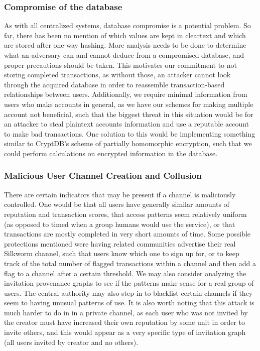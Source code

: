 \documentclass[letterpaper,twocolumn,10pt]{article}
\begin{document}
\subsubsection{Compromise of the database}
As with all centralized systems, database compromise is a potential problem. So far, there has been no mention of which values are kept in cleartext and which are stored after one-way hashing. More analysis needs to be done to determine what an adversary can and cannot deduce from a compromised database, and proper precautions should be taken. This motivates our commitment to not storing completed transactions, as without those, an attacker cannot look through the acquired database in order to reassemble transaction-based relationships between users. Additionally, we require minimal information from users who make accounts in general, as we have our schemes for making multiple account not beneficial, such that the biggest threat in this situation would be for an attacker to steal plaintext accounts information and use a reputable account to make bad transactions. One solution to this would be implementing something similar to CryptDB's \cite{CryptDB} scheme of partially homomorphic encryption, such that we could perform calculations on encrypted information in the database. 

\subsubsection{Malicious User Channel Creation and Collusion}
There are certain indicators that may be present if a channel is maliciously controlled. One would be that all users have generally similar amounts of reputation and transaction scores, that access patterns seem relatively uniform (as opposed to timed when a group humans would use the service), or that transactions are mostly completed in very short amounts of time. Some possible protections mentioned were having related communities advertise their real Silkworm channel, such that users know which one to sign up for, or to keep track of the total number of flagged transactions within a channel and then add a flag to a channel after a certain threshold. We may also consider analyzing the invitation provenance graphs to see if the patterns make sense for a real group of users. The central authority may also step in to blacklist certain channels if they seem to having unusual patterns of use. It is also worth noting that this attack is much harder to do in in a private channel, as each user who was not invited by the creator must have increased their own reputation by some unit in order to invite others, and this would appear as a very specific type of invitation graph (all users invited by creator and no others). 
\end{document}
